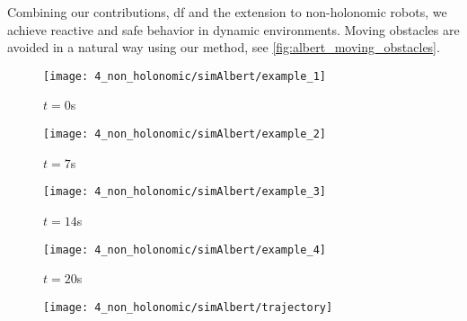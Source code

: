 %
Combining our contributions, \ac{df} and the extension to non\hyp{}holonomic robots, we
achieve reactive and safe behavior in dynamic environments. Moving obstacles are avoided in a natural way
using our method, see \cref{fig:albert_moving_obstacles}.
%
\begin{figure*}
  \centering
  \begin{subfigure}{.2\linewidth}
    \centering
    \texttt{[image: 4\_non\_holonomic/simAlbert/example\_1]}
  \caption{$t=0$s}
  \end{subfigure}%
  \begin{subfigure}{.2\linewidth}
    \centering
    \texttt{[image: 4\_non\_holonomic/simAlbert/example\_2]}
  \caption{$t=7$s}
  \end{subfigure}%
  \begin{subfigure}{.2\linewidth}
    \centering
    \texttt{[image: 4\_non\_holonomic/simAlbert/example\_3]}
  \caption{$t=14$s}
  \end{subfigure}%
  \begin{subfigure}{.2\linewidth}
    \centering
    \texttt{[image: 4\_non\_holonomic/simAlbert/example\_4]}
  \caption{$t=20$s}
  \end{subfigure}%
  \begin{subfigure}{.2\linewidth}
    \centering
    \texttt{[image: 4\_non\_holonomic/simAlbert/trajectory]}
  \caption{}%
  \label{subfig:albert_moving_obstacles}
  \end{subfigure}
  \caption{Sequence of trajectory computed with \ac{df} for a mobile manipulator in simulation with moving obstacles (red sphere with line indicating the past trajectory) and one end-effector goal (green). The trajectory of the end-effector are 
  visualized in (e) as \x{} and the desired end-effector
  position as \xt{}.
  }%
  \label{fig:albert_moving_obstacles}
\end{figure*}
%

